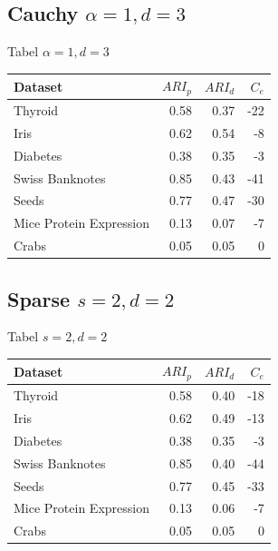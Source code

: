 \documentclass[ignorenonframetext,]{beamer}
\begin{document}
\subsection{\texorpdfstring{Cauchy
\(\alpha = 1, d = 3\)}{Cauchy \textbackslash{}alpha = 1, d = 3}}\label{cauchy-alpha-1-d-3}

\begin{frame}{Tabel \(\alpha = 1, d = 3\)}

\begin{center}


\begin{tabular}{l|r|r|r}
\hline
Dataset & ${ARI}_p$ & ${ARI}_d$ & $C_e$\\
\hline
Thyroid & 0.58 & 0.37 & -22\\
\hline
Iris & 0.62 & 0.54 & -8\\
\hline
Diabetes & 0.38 & 0.35 & -3\\
\hline
Swiss Banknotes & 0.85 & 0.43 & -41\\
\hline
Seeds & 0.77 & 0.47 & -30\\
\hline
Mice Protein Expression & 0.13 & 0.07 & -7\\
\hline
Crabs & 0.05 & 0.05 & 0\\
\hline
\end{tabular}

\end{center}

\end{frame}

\subsection{\texorpdfstring{Sparse
\(s = 2, d = 2\)}{Sparse s = 2, d = 2}}\label{sparse-s-2-d-2}

\begin{frame}{Tabel \(s = 2, d = 2\)}

\begin{center}


\begin{tabular}{l|r|r|r}
\hline
Dataset & ${ARI}_p$ & ${ARI}_d$ & $C_e$\\
\hline
Thyroid & 0.58 & 0.40 & -18\\
\hline
Iris & 0.62 & 0.49 & -13\\
\hline
Diabetes & 0.38 & 0.35 & -3\\
\hline
Swiss Banknotes & 0.85 & 0.40 & -44\\
\hline
Seeds & 0.77 & 0.45 & -33\\
\hline
Mice Protein Expression & 0.13 & 0.06 & -7\\
\hline
Crabs & 0.05 & 0.05 & 0\\
\hline
\end{tabular}

\end{center}

\end{frame}
\end{document}
